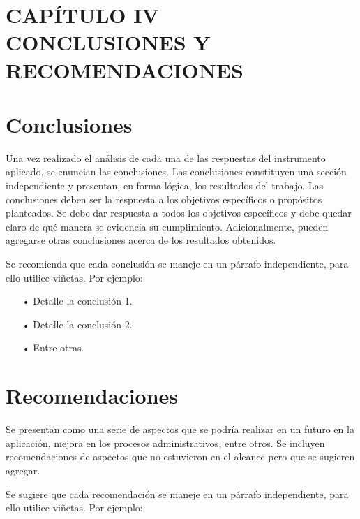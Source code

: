 \documentclass[12pt, a4paper, nofontenc, numbers=endperiod]{apa7}
\begin{document}
\newpage
{

	\setlength\headsep{2.95cm}
	\addtolength{\textheight}{-2.45cm}
	\section*{\large \centering CAPÍTULO IV\\ CONCLUSIONES Y RECOMENDACIONES}
	\section{\normalsize \centering Conclusiones}
	\setlength{\parindent}{1.27cm}Una vez realizado el análisis de cada una de las respuestas del instrumento aplicado, se enuncian las conclusiones. Las conclusiones constituyen una sección independiente y presentan, en forma lógica, los resultados del trabajo. Las conclusiones deben ser la respuesta a los objetivos específicos o propósitos planteados. Se debe dar respuesta a todos los objetivos específicos y debe quedar claro de qué manera se evidencia su cumplimiento.  Adicionalmente, pueden agregarse otras conclusiones acerca de los resultados obtenidos.
	
	\setlength{\parindent}{1.27cm}Se recomienda que cada conclusión se maneje en un párrafo independiente, para ello utilice viñetas. Por ejemplo:
	{\doublespacing
		\begin{itemize}	[leftmargin=1.70cm]
			\item[•]Detalle la conclusión 1.
			\item[•]Detalle la conclusión 2.
			\item[•]Entre otras.
		\end{itemize}
	}
	
	\section{\normalsize \centering Recomendaciones}
	
	\setlength{\parindent}{1.27cm}Se presentan como una serie de aspectos que se podría realizar en un futuro en la aplicación, mejora en los procesos administrativos, entre otros. Se incluyen recomendaciones de aspectos que no estuvieron en el alcance pero que se sugieren agregar.
	
	\setlength{\parindent}{1.27cm}Se sugiere que cada recomendación se maneje en un párrafo independiente, para ello utilice viñetas. Por ejemplo:
	
}
\end{document}
